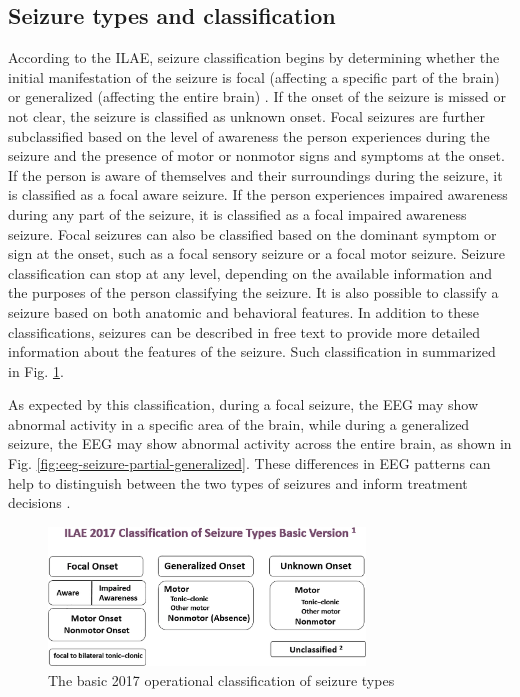 \subsection{Seizure types and classification}

According to the \gls{ILAE}, seizure classification begins by determining whether the initial manifestation of the seizure is focal (affecting a specific part of the brain) or generalized (affecting the entire brain) \cite{fisher_instruction_2017, fisher_operational_2017}. If the onset of the seizure is missed or not clear, the seizure is classified as unknown onset. Focal seizures are further subclassified based on the level of awareness the person experiences during the seizure and the presence of motor or nonmotor signs and symptoms at the onset. If the person is aware of themselves and their surroundings during the seizure, it is classified as a focal aware seizure. If the person experiences impaired awareness during any part of the seizure, it is classified as a focal impaired awareness seizure. Focal seizures can also be classified based on the dominant symptom or sign at the onset, such as a focal sensory seizure or a focal motor seizure. Seizure classification can stop at any level, depending on the available information and the purposes of the person classifying the seizure. It is also possible to classify a seizure based on both anatomic and behavioral features. In addition to these classifications, seizures can be described in free text to provide more detailed information about the features of the seizure. Such classification in summarized in Fig. \ref{fig:ILAE-seizure-types}.

As expected by this classification, during a focal seizure, the EEG may show abnormal activity in a specific area of the brain, while during a generalized seizure, the EEG may show abnormal activity across the entire brain, as shown in Fig. \ref{fig:eeg-seizure-partial-generalized}. These differences in EEG patterns can help to distinguish between the two types of seizures and inform treatment decisions \cite{raga_electroclinical_2021}.


\begin{figure}[t]
    \centering
    \includegraphics[width=0.75\textwidth]{images/Th-background/ILAE-seizure-types.png}
    \caption{The basic  2017 operational classification of seizure types \cite{fisher_instruction_2017, fisher_operational_2017}}
    \label{fig:ILAE-seizure-types}
\end{figure}

